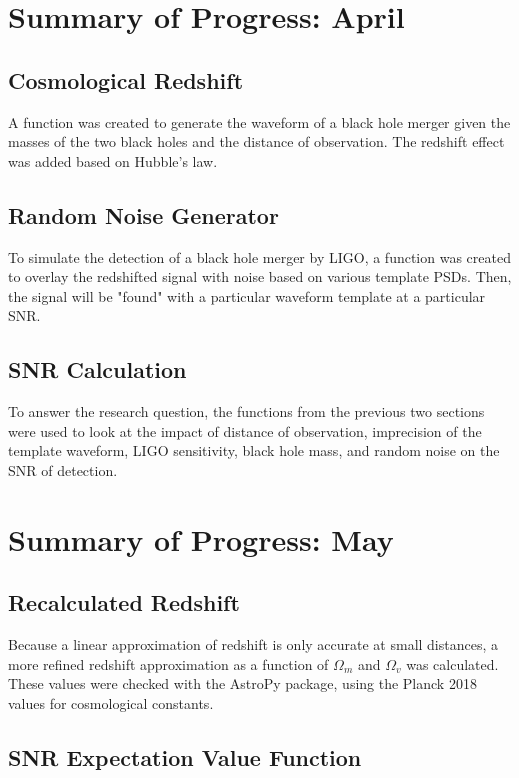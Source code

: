 \documentclass[10pt]{article}
\begin{document}
\begin{multicols*}{2}
\section{Summary of Progress: April}

\subsection{Cosmological Redshift}

A function was created to generate the waveform of a black hole merger given the masses of the two black holes and the distance of observation. The redshift effect was added based on Hubble's law. 

\subsection{Random Noise Generator}

To simulate the detection of a black hole merger by LIGO, a function was created to overlay the redshifted signal with noise based on various template PSDs. Then, the signal will be "found" with a particular waveform template at a particular SNR. 

\subsection{SNR Calculation}

To answer the research question, the functions from the previous two sections were used to look at the impact of distance of observation, imprecision of the template waveform, LIGO sensitivity, black hole mass, and random noise on the SNR of detection. 

\section{Summary of Progress: May}

\subsection{Recalculated Redshift}

Because a linear approximation of redshift is only accurate at small distances, a more refined redshift approximation as a function of $\Omega_m$ and $\Omega_v$ was calculated. These values were checked with the AstroPy package, using the Planck 2018 values for cosmological constants. 

\subsection{SNR Expectation Value Function}


\end{multicols*}
\end{document}
